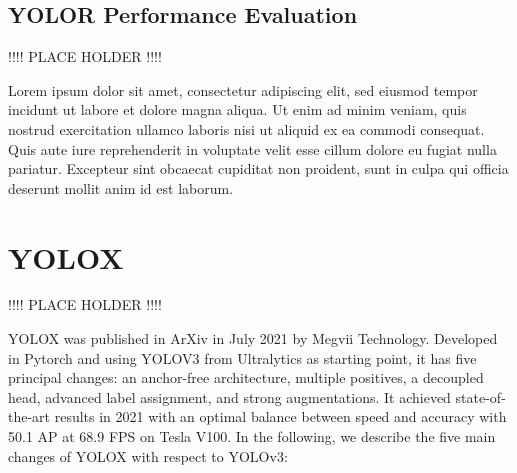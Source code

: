 \documentclass{article}
\begin{document}
\subsection{YOLOR Performance Evaluation}

!!!! PLACE HOLDER !!!!

Lorem ipsum dolor sit amet, consectetur adipiscing elit, sed eiusmod tempor incidunt ut labore et dolore magna aliqua. Ut enim ad minim veniam, quis nostrud exercitation ullamco laboris nisi ut aliquid ex ea commodi consequat. Quis aute iure reprehenderit in voluptate velit esse cillum dolore eu fugiat nulla pariatur. Excepteur sint obcaecat cupiditat non proident, sunt in culpa qui officia deserunt mollit anim id est laborum.



\section{YOLOX}

!!!! PLACE HOLDER !!!!


YOLOX \cite{ge2021yolox} was published in ArXiv in July 2021 by Megvii Technology. Developed in Pytorch and using YOLOV3 from Ultralytics as starting point, it has five principal changes: an anchor-free architecture, multiple positives, a decoupled head, advanced label assignment, and strong augmentations. It achieved state-of-the-art results in 2021 with an optimal balance between speed and accuracy with 50.1 AP at 68.9 FPS on Tesla V100. In the following, we describe the five main changes of YOLOX with respect to YOLOv3:
\end{document}
